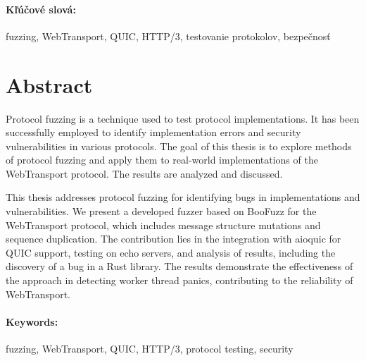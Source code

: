 \documentclass[12pt, twoside, openany]{book}
\begin{document}
\paragraph*{K\v{l}\'{u}\v{c}ov\'{e} slov\'{a}:} fuzzing, WebTransport, QUIC, HTTP/3, testovanie protokolov, bezpe\v{c}nos\v{t}


\newpage 
\section*{Abstract}

Protocol fuzzing is a technique used to test protocol implementations. It has been successfully employed to identify implementation errors and security vulnerabilities in various protocols. The goal of this thesis is to explore methods of protocol fuzzing and apply them to real-world implementations of the WebTransport protocol. The results are analyzed and discussed.

This thesis addresses protocol fuzzing for identifying bugs in implementations and vulnerabilities. We present a developed fuzzer based on BooFuzz for the WebTransport protocol, which includes message structure mutations and sequence duplication. The contribution lies in the integration with aioquic for QUIC support, testing on echo servers, and analysis of results, including the discovery of a bug in a Rust library. The results demonstrate the effectiveness of the approach in detecting worker thread panics, contributing to the reliability of WebTransport.

\paragraph*{Keywords:} fuzzing, WebTransport, QUIC, HTTP/3, protocol testing, security



\cleardoublepage

\tableofcontents



\newpage 

\listoffigures
\listoftables

\end{document}
